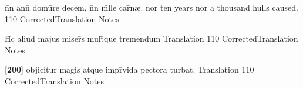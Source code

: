 \latline
  {n\={}n ann\={\macron {\i}} domu\={}re decem, n\={}n m\={\macron {\i}}lle car\={\macron {\i}}n{\ae}.}
  { nor ten years nor a thousand hulls caused. }
  {110}
  { CorrectedTranslation }
  { Notes }


\latline
  {H\={\macron {\i}}c aliud majus miser\={\macron {\i}}s mult\={}que tremendum}
  { Translation }
  {110}
  { CorrectedTranslation }
  { Notes }


\latline
  {[\textbf{200}] objicitur magis atque impr\={}vida pectora turbat.}
  { Translation }
  {110}
  { CorrectedTranslation }
  { Notes }


